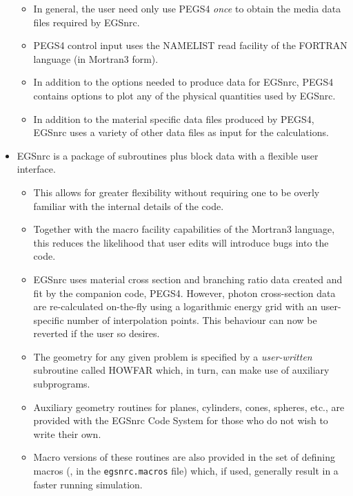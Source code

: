 \begin{itemize}
\begin{itemize}
  \item In general, the user need only use PEGS4 {\it once} to
  obtain the media data files required by EGSnrc.
   
  \item PEGS4 control input uses the NAMELIST read facility of
  the FORTRAN language (in Mortran3 form).
   
  \item In addition to the options needed to produce data for
  EGSnrc, PEGS4 contains options to plot any of the physical
  quantities used by EGSnrc.
 
  \item In addition to the material specific data files produced by PEGS4,
   EGSnrc uses a variety of other data files as input for the calculations.
\end{itemize} 
 
\item EGSnrc is a package of subroutines plus block data with
a flexible user interface.
   
  \begin{itemize} 
  \item This allows for greater flexibility without requiring
  one to be overly familiar with the internal details of the code.
   
  \item Together with the macro facility capabilities of the
  Mortran3 language, this reduces the likelihood that user edits
  will introduce bugs into the code.
   
  \item EGSnrc uses material cross section and branching ratio
  data created and fit by the companion code, PEGS4. However,
  photon cross-section data are re-calculated on-the-fly
  using a logarithmic energy grid with an user-specific number
  of interpolation points. This behaviour can now be reverted
  if the user so desires.
 
\item The geometry for any given problem is specified by a
{\it user-written} subroutine called HOWFAR which, in turn,
can make use of auxiliary subprograms.
   
  \item Auxiliary geometry routines for planes, cylinders,
  cones, spheres, etc., are provided with the EGSnrc Code System
  for those who do not wish to write their own.
   
  \item Macro versions of these routines are also provided in the
  set of defining macros (\ie, in the {\tt egsnrc.macros} file) which,
  if used, generally result in a faster running simulation.
   

\end{itemize}
\end{itemize}
